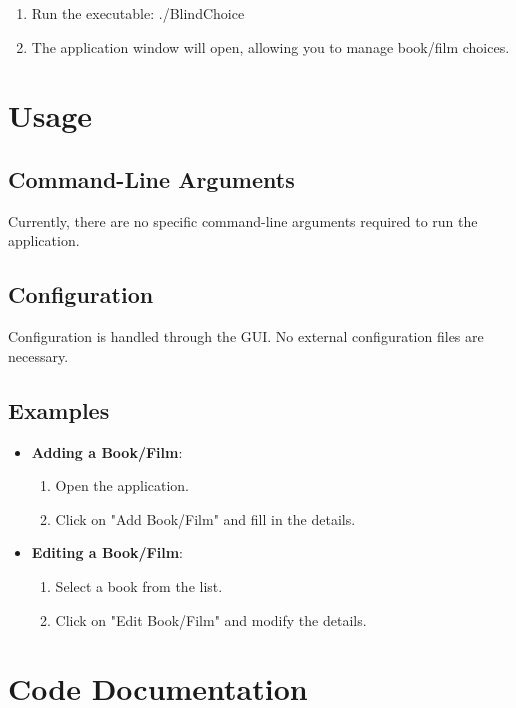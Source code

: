 \documentclass{article}
\begin{document}
\begin{enumerate}
    \item Run the executable:
    ./BlindChoice
    \item The application window will open, allowing you to manage book/film choices.
\end{enumerate}




\section{Usage}


\subsection{Command-Line Arguments}
Currently, there are no specific command-line arguments required to run the application.


\subsection{Configuration}
Configuration is handled through the GUI. No external configuration files are necessary.


\subsection{Examples}

\begin{itemize}
    \item \textbf{Adding a Book/Film}:
    \begin{enumerate}
        \item Open the application.
        \item Click on "Add Book/Film" and fill in the details.
    \end{enumerate}
    \item \textbf{Editing a Book/Film}:
    \begin{enumerate}
        \item Select a book from the list.
        \item Click on "Edit Book/Film" and modify the details.
    \end{enumerate}
\end{itemize}



\section{Code Documentation}
\end{document}
